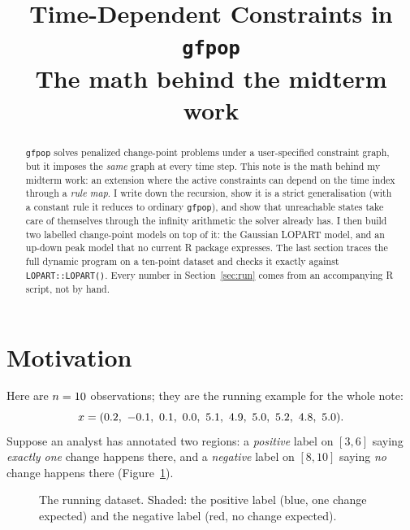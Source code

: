 \documentclass[11pt]{article}
\title{\textbf{Time-Dependent Constraints in \texttt{gfpop}}\\[2pt]
\large The math behind the midterm work}
\author{}
\date{}
\theoremstyle{definition}
\theoremstyle{plain}
\theoremstyle{remark}
\begin{document}
\maketitle
\vspace{-3em}

\begin{abstract}
\noindent \texttt{gfpop} solves penalized change-point problems under a
user-specified constraint graph, but it imposes the \emph{same} graph at every
time step. This note is the math behind my midterm work: an extension where the
active constraints can depend on the time index through a \emph{rule map}. I
write down the recursion, show it is a strict generalisation (with a constant
rule it reduces to ordinary \texttt{gfpop}), and show that unreachable states
take care of themselves through the infinity arithmetic the solver already has.
I then build two labelled change-point models on top of it: the Gaussian LOPART
model, and an up-down peak model that no current R package expresses. The last
section traces the full dynamic program on a ten-point dataset and checks it
exactly against \texttt{LOPART::LOPART()}. Every number in
Section~\ref{sec:run} comes from an accompanying R script, not by hand.
\end{abstract}

\section{Motivation}\label{sec:motivation}

Here are $n=10$ observations; they are the running example for the whole
note:
\[
  x = (0.2,\ -0.1,\ 0.1,\ 0.0,\ 5.1,\ 4.9,\ 5.0,\ 5.2,\ 4.8,\ 5.0).
\]
Suppose an analyst has annotated two regions: a \emph{positive} label on $[3,6]$
saying \emph{exactly one} change happens there, and a \emph{negative}
label on $[8,10]$ saying \emph{no} change happens there (Figure~\ref{fig:data}).

\begin{figure}[h]
\centering
{}
\caption{The running dataset. Shaded: the positive label (blue, one change
expected) and the negative label (red, no change expected).}
\label{fig:data}
\end{figure}
\end{document}
